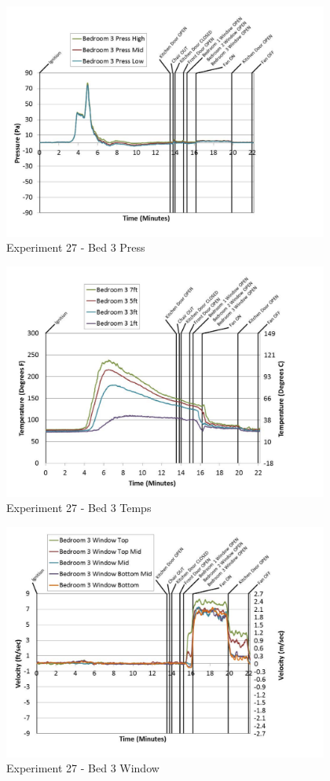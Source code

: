 \documentclass{article}
\begin{document}
\begin{appendices}
	\clearpage

	\begin{figure}[h!]
		\centering
		\includegraphics[height=3.05in]{0_Images/Results_Charts/Exp_27_Charts/Bed3Press.pdf}
		\caption{Experiment 27 - Bed 3 Press}
	\end{figure}
 

	\begin{figure}[h!]
		\centering
		\includegraphics[height=3.05in]{0_Images/Results_Charts/Exp_27_Charts/Bed3Temps.pdf}
		\caption{Experiment 27 - Bed 3 Temps}
	\end{figure}
 
	\clearpage

	\begin{figure}[h!]
		\centering
		\includegraphics[height=3.05in]{0_Images/Results_Charts/Exp_27_Charts/Bed3Window.pdf}
		\caption{Experiment 27 - Bed 3 Window}
	\end{figure}
 


\end{appendices}
\end{document}
